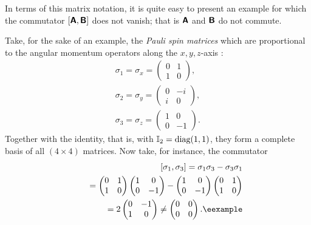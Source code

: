{\color{blue}
\bexample
In terms of this matrix notation, it is quite easy to present an example
for which the commutator
$
[\textsf{\textbf{A}}, \textsf{\textbf{B}} ]
$
does not vanish; that is
$\textsf{\textbf{A}}$  and $\textsf{\textbf{B}}$
do not commute.

Take, for the sake of an example, the
{\em Pauli spin matrices}
which are proportional to the angular momentum operators along the $x,y,z$-axis
\cite{schiff-55}:
\begin{equation}
\begin{split}
\sigma_1=\sigma_x
=
\begin{pmatrix}
0&1\\
1&0
\end{pmatrix}
,   \\
\sigma_2=\sigma_y
=
\begin{pmatrix}
0&-i\\
i&0
\end{pmatrix}
,   \\
\sigma_3=\sigma_z
=
\begin{pmatrix}
1&0\\
0&-1
\end{pmatrix}
.
\end{split}
\end{equation}
Together with the identity, that is, with ${\Bbb I}_2=\textrm{diag}(1,1)$,
they form a complete basis of all $(4\times 4)$ matrices.
Now take, for instance, the commutator
\begin{equation}
\begin{split}
[\sigma_1,\sigma_3]= \sigma_1\sigma_3-\sigma_3\sigma_1\\
\qquad
=
\begin{pmatrix}
0&1\\
1&0
\end{pmatrix}
\begin{pmatrix}
1&0\\
0&-1
\end{pmatrix}
-
\begin{pmatrix}
1&0\\
0&-1
\end{pmatrix}
\begin{pmatrix}
0&1\\
1&0
\end{pmatrix}
\\
\qquad
=  2
\begin{pmatrix}
0&-1\\
1&0
\end{pmatrix}
\neq
\begin{pmatrix}
0&0\\
0&0
\end{pmatrix}
.    \textrm{\eexample}
\end{split}
\end{equation}
}


